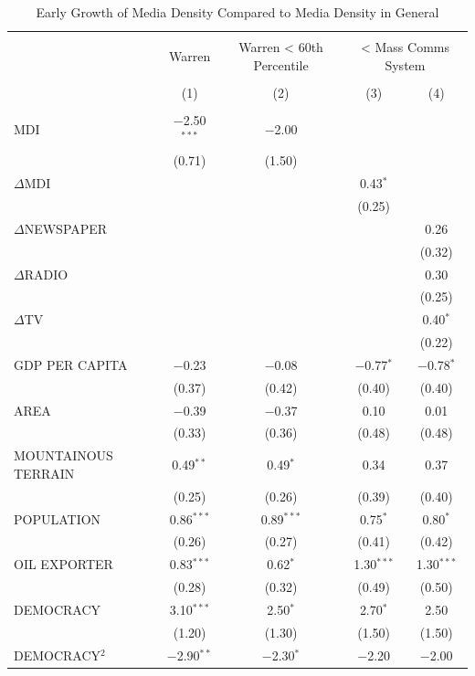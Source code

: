 \documentclass[11pt,article,oneside]{memoir}
\begin{document}
\begin{table}[!htbp] \centering 
  \caption{Early Growth of Media Density Compared to Media Density in General} 
  \label{} 
\footnotesize 
\begin{tabular}{@{\extracolsep{5pt}}lcccc} 
\\[-1.8ex]\hline \\[-1.8ex] 
 & Warren & Warren < 60th Percentile & \multicolumn{2}{c}{< Mass Comms System} \\ 
\\[-1.8ex] & (1) & (2) & (3) & (4)\\ 
\hline \\[-1.8ex] 
 MDI & $-$2.50$^{***}$ & $-$2.00 &  &  \\ 
  & (0.71) & (1.50) &  &  \\ 
  $\Delta$MDI &  &  & 0.43$^{*}$ &  \\ 
  &  &  & (0.25) &  \\ 
  $\Delta$NEWSPAPER &  &  &  & 0.26 \\ 
  &  &  &  & (0.32) \\ 
  $\Delta$RADIO &  &  &  & 0.30 \\ 
  &  &  &  & (0.25) \\ 
  $\Delta$TV &  &  &  & 0.40$^{*}$ \\ 
  &  &  &  & (0.22) \\ 
  GDP PER CAPITA & $-$0.23 & $-$0.08 & $-$0.77$^{*}$ & $-$0.78$^{*}$ \\ 
  & (0.37) & (0.42) & (0.40) & (0.40) \\ 
  AREA & $-$0.39 & $-$0.37 & 0.10 & 0.01 \\ 
  & (0.33) & (0.36) & (0.48) & (0.48) \\ 
  MOUNTAINOUS TERRAIN & 0.49$^{**}$ & 0.49$^{*}$ & 0.34 & 0.37 \\ 
  & (0.25) & (0.26) & (0.39) & (0.40) \\ 
  POPULATION & 0.86$^{***}$ & 0.89$^{***}$ & 0.75$^{*}$ & 0.80$^{*}$ \\ 
  & (0.26) & (0.27) & (0.41) & (0.42) \\ 
  OIL EXPORTER & 0.83$^{***}$ & 0.62$^{*}$ & 1.30$^{***}$ & 1.30$^{***}$ \\ 
  & (0.28) & (0.32) & (0.49) & (0.50) \\ 
  DEMOCRACY & 3.10$^{***}$ & 2.50$^{*}$ & 2.70$^{*}$ & 2.50 \\ 
  & (1.20) & (1.30) & (1.50) & (1.50) \\ 
  DEMOCRACY$^2$ & $-$2.90$^{**}$ & $-$2.30$^{*}$ & $-$2.20 & $-$2.00 \\ 

\end{tabular}
\end{table}
\end{document}
